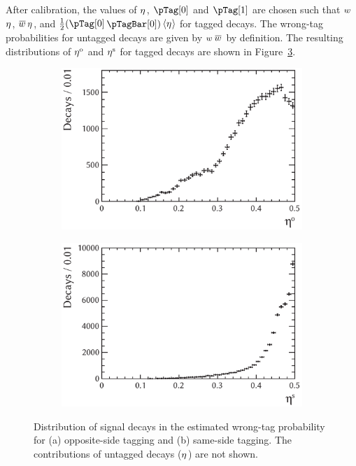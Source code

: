 After calibration, the values of $\eta^{}$, $\pTag[0]$ and $\pTag[1]$ are chosen such that
$w^{}$\texteq$\eta^{}$, $\wTagBar$\texteq$\eta^{}$, and $\tfrac{1}{2}(\pTag[0]$\textplus$\pTagBar[0])$\texteq$\langle\eta^{}\rangle$ for
tagged decays. The wrong-tag probabilities for untagged decays are given by $w^{}$\textequiv$\wTagBar$ by definition. The
resulting distributions of $\eta^{\text{o}}$ and $\eta^{\text{s}}$ for tagged decays are shown in Figure~\ref{fig:etaDists}. 
\begin{figure}[htbp]
  \centering
  \begin{subfigure}{0.49\textwidth}
    \includegraphics[width=\textwidth]{graphics/analysis/etaOS}
    \caption{}
    \label{fig:etaOS}
  \end{subfigure}%
  \hfill%
  \begin{subfigure}{0.49\textwidth}
    \includegraphics[width=\textwidth]{graphics/analysis/etaSS}
    \caption{}
    \label{fig:etaSS}
  \end{subfigure}
  \caption{Distribution of \BstoJpsiKK{} signal decays in the estimated wrong-tag probability
           for (a) opposite-side tagging and (b) same-side tagging.
           The contributions of untagged decays ($\eta^{}$) are not shown.}
  \label{fig:etaDists}
\end{figure}

